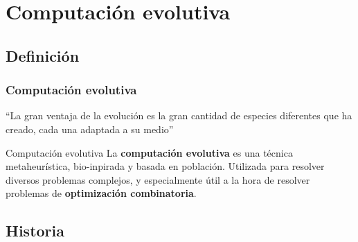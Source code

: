 \documentclass{beamer}
\begin{document}
\section{Computación evolutiva}


\subsection{Definición}

\begin{frame}
\frametitle{Computación evolutiva}

\begin{exampleblock}{}
  {\large ``La gran ventaja de la evolución es la gran cantidad de especies diferentes que ha creado, cada una adaptada a su medio''}
  \vskip5mm
  \hspace*{}
\end{exampleblock}

\begin{block}{Computación evolutiva}
 La \textbf{computación evolutiva} es una técnica metaheurística, bio-inpirada y basada en población. Utilizada para resolver diversos problemas complejos, y especialmente útil a la hora de resolver problemas de \textbf{optimización combinatoria}.
\end{block}

\end{frame}

\subsection{Historia}
\end{document}
